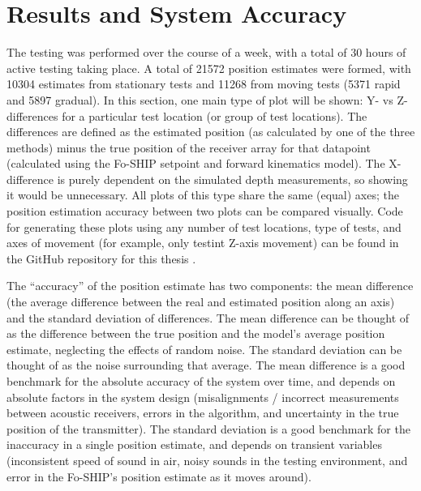 \documentclass[11pt]{ucthesisCP}
\begin{document}
\section{Results and System Accuracy} \label{sec:6s2}
The testing was performed over the course of a week, with a total of 30 hours of active testing taking place. A total of 21572 position estimates were formed, with 10304 estimates from stationary tests and 11268 from moving tests (5371 rapid and 5897 gradual). In this section, one main type of plot will be shown: Y- vs Z-differences for a particular test location (or group of test locations). The differences are defined as the estimated position (as calculated by one of the three methods) minus the true position of the receiver array for that datapoint (calculated using the Fo-SHIP setpoint and forward kinematics model). The X-difference is purely dependent on the simulated depth measurements, so showing it would be unnecessary. All plots of this type share the same (equal) axes; the position estimation accuracy between two plots can be compared visually. Code for generating these plots using any number of test locations, type of tests, and axes of movement (for example, only testint Z-axis movement) can be found in the GitHub repository for this thesis \cite{thesisgit}.

The “accuracy” of the position estimate has two components: the mean difference (the average difference between the real and estimated position along an axis) and the standard deviation of differences. The mean difference can be thought of as the difference between the true position and the model’s average position estimate, neglecting the effects of random noise. The standard deviation can be thought of as the noise surrounding that average. The mean difference is a good benchmark for the absolute accuracy of the system over time, and depends on absolute factors in the system design (misalignments / incorrect measurements between acoustic receivers, errors in the algorithm, and uncertainty in the true position of the transmitter). The standard deviation is a good benchmark for the inaccuracy in a single position estimate, and depends on transient variables (inconsistent speed of sound in air, noisy sounds in the testing environment, and error in the Fo-SHIP’s position estimate as it moves around).
\end{document}
